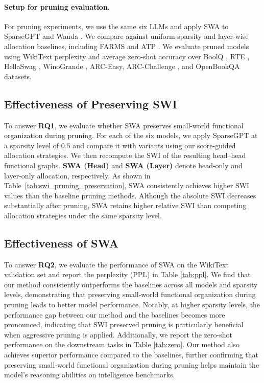 \paragraph{Setup for pruning evaluation.}
For pruning experiments, we use the same six LLMs and apply SWA to SparseGPT \cite{frantar2023sparsegpt} and Wanda \cite{sun2023simple}. We compare against uniform sparsity and layer-wise allocation baselines, including FARMS \cite{hu2025eigenspectrum} and ATP \cite{huang2025determining}. We evaluate pruned models using WikiText perplexity \cite{merity2016pointer} and average zero-shot accuracy over BoolQ \cite{clark2019boolq}, RTE \cite{wang2018glue}, HellaSwag \cite{zellers2019hellaswag}, WinoGrande \cite{sakaguchi2021winogrande}, ARC-Easy, ARC-Challenge \cite{clark2018think}, and OpenBookQA \cite{mihaylov2018can} datasets.


\subsection{Effectiveness of Preserving SWI}

To answer \textbf{RQ1}, we evaluate whether SWA preserves small-world functional organization during pruning. For each of the six models, we apply SparseGPT at a sparsity level of $0.5$ and compare it with variants using our score-guided allocation strategies. We then recompute the SWI of the resulting head--head functional graphs. \textbf{SWA (Head)} and \textbf{SWA (Layer)} denote head-only and layer-only allocation, respectively. As shown in Table~\ref{tab:swi_pruning_preservation}, SWA consistently achieves higher SWI values than the baseline pruning methods. Although the absolute SWI decreases substantially after pruning, SWA retains higher relative SWI than competing allocation strategies under the same sparsity level.





\subsection{Effectiveness of SWA}
To answer \textbf{RQ2}, we evaluate the performance of SWA on the WikiText validation set and report the perplexity (PPL) in Table \ref{tab:ppl}. We find that our method consistently outperforms the baselines across all models and sparsity levels, demonstrating that preserving small-world functional organization during pruning leads to better model performance. Notably, at higher sparsity levels, the performance gap between our method and the baselines becomes more pronounced, indicating that SWI preserved pruning is particularly beneficial when aggressive pruning is applied. Additionally, we report the zero-shot performance on the downstream tasks in Table \ref{tab:zero}. Our method also achieves superior performance compared to the baselines, further confirming that preserving small-world functional organization during pruning helps maintain the model's reasoning abilities on intelligence benchmarks.

